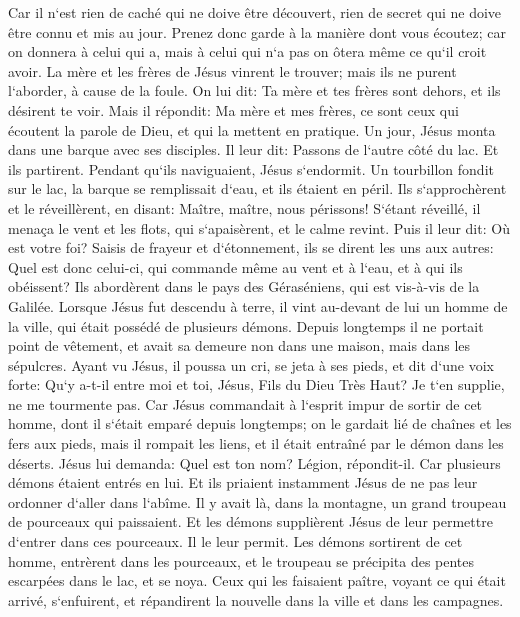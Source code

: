 \verse Car il n`est rien de caché qui ne doive être découvert, rien de secret qui ne doive être connu et mis au jour. 
\verse Prenez donc garde à la manière dont vous écoutez; car on donnera à celui qui a, mais à celui qui n`a pas on ôtera même ce qu`il croit avoir. 
\verse La mère et les frères de Jésus vinrent le trouver; mais ils ne purent l`aborder, à cause de la foule. 
\verse On lui dit: Ta mère et tes frères sont dehors, et ils désirent te voir. 
\verse Mais il répondit: Ma mère et mes frères, ce sont ceux qui écoutent la parole de Dieu, et qui la mettent en pratique. 
\verse Un jour, Jésus monta dans une barque avec ses disciples. Il leur dit: Passons de l`autre côté du lac. Et ils partirent. 
\verse Pendant qu`ils naviguaient, Jésus s`endormit. Un tourbillon fondit sur le lac, la barque se remplissait d`eau, et ils étaient en péril. 
\verse Ils s`approchèrent et le réveillèrent, en disant: Maître, maître, nous périssons! S`étant réveillé, il menaça le vent et les flots, qui s`apaisèrent, et le calme revint. 
\verse Puis il leur dit: Où est votre foi? Saisis de frayeur et d`étonnement, ils se dirent les uns aux autres: Quel est donc celui-ci, qui commande même au vent et à l`eau, et à qui ils obéissent? 
\verse Ils abordèrent dans le pays des Géraséniens, qui est vis-à-vis de la Galilée. 
\verse Lorsque Jésus fut descendu à terre, il vint au-devant de lui un homme de la ville, qui était possédé de plusieurs démons. Depuis longtemps il ne portait point de vêtement, et avait sa demeure non dans une maison, mais dans les sépulcres. 
\verse Ayant vu Jésus, il poussa un cri, se jeta à ses pieds, et dit d`une voix forte: Qu`y a-t-il entre moi et toi, Jésus, Fils du Dieu Très Haut? Je t`en supplie, ne me tourmente pas. 
\verse Car Jésus commandait à l`esprit impur de sortir de cet homme, dont il s`était emparé depuis longtemps; on le gardait lié de chaînes et les fers aux pieds, mais il rompait les liens, et il était entraîné par le démon dans les déserts. 
\verse Jésus lui demanda: Quel est ton nom? Légion, répondit-il. Car plusieurs démons étaient entrés en lui. 
\verse Et ils priaient instamment Jésus de ne pas leur ordonner d`aller dans l`abîme. 
\verse Il y avait là, dans la montagne, un grand troupeau de pourceaux qui paissaient. Et les démons supplièrent Jésus de leur permettre d`entrer dans ces pourceaux. Il le leur permit. 
\verse Les démons sortirent de cet homme, entrèrent dans les pourceaux, et le troupeau se précipita des pentes escarpées dans le lac, et se noya. 
\verse Ceux qui les faisaient paître, voyant ce qui était arrivé, s`enfuirent, et répandirent la nouvelle dans la ville et dans les campagnes. 
